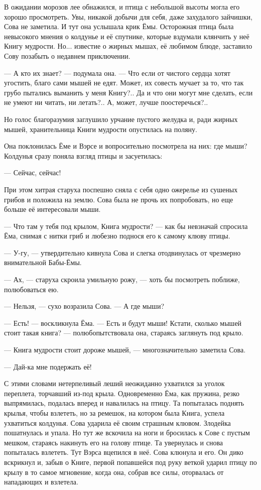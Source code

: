 \documentclass[oneside,final,14pt]{extreport}
\begin{document}
	В ожидании морозов лее обнажился, и птица с небольшой высоты могла его хорошо просмотреть. Увы, никакой добычи для себя, даже захудалого зайчишки, Сова не заметила. И тут она услышала крик Ёмы. Осторожная птица была невысокого мнения о колдунье и её спутнике, которые вздумали клянчить у неё Книгу мудрости. Но... известие о жирных мышах, её любимом блюде, заставило Сову позабыть о недавнем приключении.
	
	— А кто их знает? — подумала она. — Что если от чистого сердца хотят угостить, благо сами мышей не едят. Может, их совесть мучает за то, что так грубо пытались выманить у меня Книгу?.. Да и что они могут мне сделать, если не умеют ни читать, ни летать?.. А, может, лучше поостеречься?..
	
	Но голос благоразумия заглушило урчание пустого желудка и, ради жирных мышей, хранительница Книги мудрости опустилась на поляну.
	
	Она поклонилась Ёме и Вэрсе и вопросительно посмотрела на них: где мыши? Колдунья сразу поняла взгляд птицы и засуетилась:
	
	— Сейчас, сейчас!
	
	При этом хитрая старуха поспешно сняла с себя одно ожерелье из сушеных грибов и положила на землю. Сова была не прочь их попробовать, но еще больше её интересовали мыши.
	
	— Что там у тебя под крылом, Книга мудрости? — как бы невзначай спросила Ёма, снимая с нитки гриб и любезно поднося его к самому клюву птицы.
	
	— У-гу, — утвердительно кивнула Сова и слегка отодвинулась от чрезмерно внимательной Бабы-Ёмы.
	
	— Ах, — старуха скроила умильную рожу, — хоть бы посмотреть поближе, полюбоваться ею.
	
	— Нельзя, — сухо возразила Сова. — А где мыши?
	
	— Есть! — воскликнула Ёма. — Есть и будут мыши! Кстати, сколько мышей стоит такая книга? — полюбопытствовала она, стараясь заглянуть под крыло.
	
	— Книга мудрости стоит дороже мышей, — многозначительно заметила Сова.
	
	— Дай-ка мне подержать её!
	
	С этими словами нетерпеливый леший неожиданно ухватился за уголок переплета, торчавший из-под крыла. Одновременно Ёма, как пружина, резко выпрямилась, подалась вперед и навалилась на птицу. Та попыталась поднять крылья, чтобы взлететь, но за ремешок, на котором была Книга, успела ухватиться колдунья. Сова ударила её своим страшным клювом. Злодейка пошатнулась и упала. Но тут же вскочила на ноги и бросилась к Сове с пустым мешком, стараясь накинуть его на голову птице. Та увернулась и снова попыталась взлететь. Тут Вэрса вцепился в неё. Сова клюнула и его. Он дико вскрикнул и, забыв о Книге, первой попавшейся под руку веткой ударил птицу по крылу в то самое мгновение, когда она, собрав все силы, оторвалась от нападающих и взлетела.
	
\end{document}
